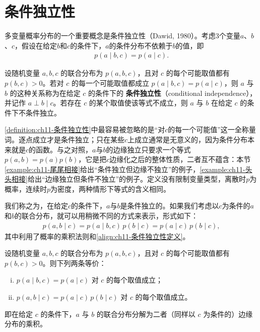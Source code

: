 \documentclass[../../main.tex]{subfiles}
\begin{document}
\section{条件独立性}\label{section:ch11-条件独立性}

多变量概率分布的一个重要概念是条件独立性（Dawid, 1980）。考虑3个变量$a$、$b$、$c$，假设在给定$b$和$c$的条件下，$a$的条件分布不依赖于$b$的值，即
\begin{align}
  p(a\mid b,c) = p(a\mid c).
  \label{align:ch11-条件独立性定义}
\end{align}

\begin{definition}[条件独立性]\label{definition:ch11-条件独立性}
设随机变量 $a,b,c$ 的联合分布为 $p(a,b,c)$，且对 $c$ 的每个可能取值都有
$p(b,c)>0$。若对 $c$ 的每一个可能取值都成立
$p(a\mid b,c)=p(a\mid c)$，则 $a$ 与 $b$ 的这种关系称为在给定 $c$ 的条件下的
\textbf{条件独立性}（conditional independence），并记作 $a\perp b\mid c$。若存在
$c$ 的某个取值使该等式不成立，则 $a$ 与 $b$ 在给定 $c$ 的条件下不条件独立。
\end{definition}

\begin{remark}
\cref{definition:ch11-条件独立性}中最容易被忽略的是“对$c$的每一个可能值”这一全称量词。逐点成立才是条件独立；只在某些$c$上成立通常是无意义的，因为条件分布本来就是$c$的函数。与之对照，$a$与$b$的边缘独立只要求一个等式$p(a,b)=p(a)p(b)$，它是把$c$边缘化之后的整体性质，二者互不蕴含：本节\cref{example:ch11-尾尾相接}给出“条件独立但边缘不独立”的例子，\cref{example:ch11-头头相接}给出“边缘独立但条件不独立”的例子。定义没有限制变量类型，离散时$p$为概率，连续时$p$为密度，两种情形下等式的含义相同。
\end{remark}

我们称之为，在给定$c$的条件下，$a$与$b$是条件独立的。如果我们考虑以$c$为条件的$a$和$b$的联合分布，就可以用稍微不同的方式来表示，形式如下：
\begin{align}
  p(a,b\mid c) = p(a\mid b,c)\,p(b\mid c) = p(a\mid c)\,p(b\mid c),
  \label{align:ch11-条件独立性分解}
\end{align}
其中利用了概率的乘积法则和\eqref{align:ch11-条件独立性定义}。

\begin{proposition}[条件独立性的等价刻画]\label{proposition:ch11-条件独立性等价}
设随机变量 $a,b,c$ 的联合分布为 $p(a,b,c)$，且对 $c$ 的每个可能取值都有
$p(b,c)>0$。则下列两条等价：
\begin{enumerate}[(i)]
  \item $p(a\mid b,c)=p(a\mid c)$ 对 $c$ 的每个取值成立；
  \item $p(a,b\mid c)=p(a\mid c)\,p(b\mid c)$ 对 $c$ 的每个取值成立。
\end{enumerate}
即在给定 $c$ 的条件下，$a$ 与 $b$ 的联合分布分解为二者（同样以 $c$ 为条件的）边缘
分布的乘积。
\end{proposition}
\end{document}
